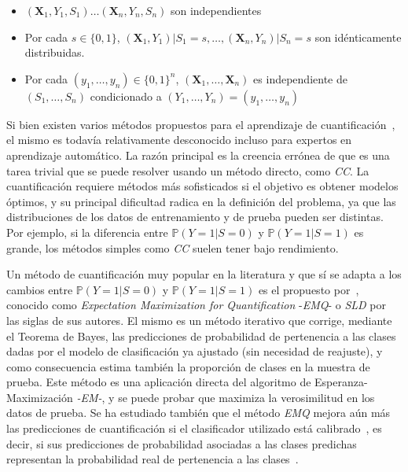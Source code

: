 \begin{itemize}
  \item $(\mathbf{X}_1,Y_1,S_1) \dots (\mathbf{X}_n,Y_n,S_n)$ son independientes
  \item Por cada $s \in \{0,1\}$,
  $(\mathbf{X}_1,Y_1)|S_1=s,\dots,(\mathbf{X}_n,Y_n)|S_n=s$ son idénticamente
  distribuidas.
  \item Por cada $(y_1,\dots,y_n)\in{\{0,1\}}^n$,
  $(\mathbf{X}_1,\dots,\mathbf{X}_n)$ es independiente de $(S_1,\dots,S_n)$
  condicionado a $(Y_1,\dots,Y_n)=(y_1,\dots,y_n)$ 
\end{itemize}

Si bien existen varios métodos propuestos para el aprendizaje de
cuantificación~\cite{esuli2023learning, gonzalez2017review}, el mismo es todavía
relativamente desconocido incluso para expertos en aprendizaje automático. La
razón principal es la creencia errónea de que es una tarea trivial que se puede
resolver usando un método directo, como {\it CC}. La cuantificación requiere
métodos más sofisticados si el objetivo es obtener modelos óptimos, y su
principal dificultad radica en la definición del problema, ya que las
distribuciones de los datos de entrenamiento y de prueba pueden ser distintas.
Por ejemplo, si la diferencia entre $\mathbb{P}(Y=1|S=0)$ y
$\mathbb{P}(Y=1|S=1)$ es grande, los métodos simples como {\it CC\/} suelen
tener bajo rendimiento.

Un método de cuantificación muy popular en la literatura y que sí se adapta a
los cambios entre $\mathbb{P}(Y=1|S=0)$ y $\mathbb{P}(Y=1|S=1)$ es el propuesto
por~\citet{saerens2002adjusting}, conocido como {\it Expectation Maximization
for Quantification\/} -{\it EMQ\/}- o {\it SLD\/} por las siglas de sus autores.
El mismo es un método iterativo que corrige, mediante el Teorema de Bayes, las
predicciones de probabilidad de pertenencia a las clases dadas por el modelo de
clasificación ya ajustado (sin necesidad de reajuste), y como consecuencia
estima también la proporción de clases en la muestra de prueba. Este método es
una aplicación directa del algoritmo de Esperanza-Maximización {\it -EM-}, y se
puede probar que maximiza la verosimilitud en los datos de prueba. Se ha
estudiado también que el método {\it EMQ\/} mejora aún más las predicciones de
cuantificación si el clasificador utilizado está
calibrado~\cite{esuli2020critical, alexandari2020maximum}, es decir, si sus
predicciones de probabilidad asociadas a las clases predichas representan la
probabilidad real de pertenencia a las clases~\cite{guo2017calibration}.

